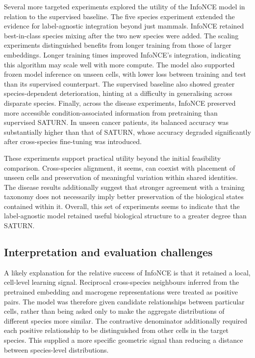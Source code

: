 \documentclass{article}
\begin{document}
Several more targeted experiments explored the utility of the InfoNCE model in relation to the supervised baseline. The five species experiment extended the evidence for label-agnostic integration beyond just mammals. InfoNCE retained best-in-class species mixing after the two new species were added. The scaling experiments distinguished benefits from longer training from those of larger embeddings. Longer training times improved InfoNCE's integration, indicating this algorithm may scale well with more compute. The model also supported frozen model inference on unseen cells, with lower loss between training and test than its supervised counterpart. The supervised baseline also showed greater species-dependent deterioration, hinting at a difficulty in generalising across disparate species. Finally, across the disease experiments, InfoNCE preserved more accessible condition-associated information from pretraining than supervised SATURN. In unseen cancer patients, its balanced accuracy was substantially higher than that of SATURN, whose accuracy degraded significantly after cross-species fine-tuning was introduced.

These experiments support practical  utility beyond the initial feasibility comparison. Cross-species alignment, it seems, can coexist with placement of unseen cells and preservation of meaningful variation within shared identities. The disease results additionally suggest that stronger agreement with a training taxonomy does not necessarily imply better preservation of the biological states contained within it. Overall, this set of experiments seems to indicate that the label-agnostic model retained useful biological structure to a greater degree than SATURN. 

\subsection{Interpretation and evaluation challenges}
A likely explanation for the relative success of InfoNCE is that it retained a local, cell-level learning signal. Reciprocal cross-species neighbours inferred from the pretrained embedding and macrogene representations were treated as positive pairs. The model was therefore given candidate relationships between particular cells, rather than being asked only to make the aggregate distributions of different species more similar. The contrastive denominator additionally required each positive relationship to be distinguished from other cells in the target species. This supplied a more specific geometric signal than reducing a distance between species-level distributions.
\end{document}
